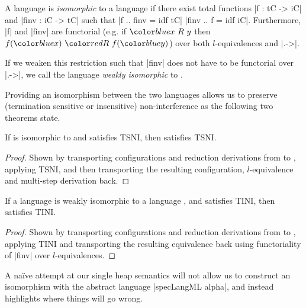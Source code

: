 \begin{definition}
  A language  is \textit{isomorphic} to a
  language  if there exist total functions |f
  : tC -> iC| and |finv : iC -> tC| such that |f .. finv = idf tC| |finv
  .. f = idf iC|.  Furthermore, |f| and |finv| are functorial (e.g. if
  $\abs{x\ R\ y}$ then $f(\abs{x})\ \con{R}\ f(\abs{y})$) over both
  $l$-equivalences and |.->|.
  
  If we weaken this restriction such that |finv| does
  not have to be functorial over |.->|, we call the
  language  \textit{weakly isomorphic} to
  .
\end{definition}

Providing an isomorphism between the two languages allows us to
preserve (termination sensitive or insensitive) non-interference
as the following two theorems state.

\begin{theorem}
  If  is isomorphic to  and  satisfies TSNI, then
   satisfies TSNI.
\end{theorem}

\begin{proof}
  Shown by transporting configurations and reduction derivations from
   to , applying TSNI, and then transporting the
  resulting configuration, $l$-equivalence and multi-step derivation back.
\end{proof}

\begin{theorem}
  If a language  is weakly isomorphic to a language , and 
  satisfies TINI, then  satisfies TINI.
\end{theorem}

\begin{proof}
  Shown by transporting configurations and reduction derivations
  from  to , applying TINI and transporting the resulting
  equivalence back using functoriality of |finv| over $l$-equivalences.
\end{proof}

A na\"ive attempt at our single heap semantics
will not allow us to construct an isomorphism
with the abstract language |specLangML alpha|, and instead highlights
where things will go wrong.





